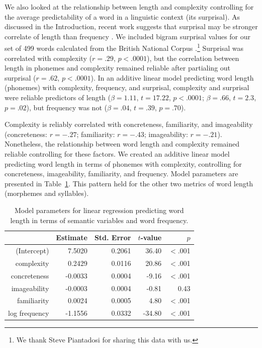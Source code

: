 \documentclass[man]{apa2}
\begin{document}
We also looked at the relationship between length and complexity controlling for the average predictability of a word in a linguistic context (its surprisal). As discussed in the Introduction, recent work suggests that surprisal may be stronger correlate of length than frequency \cite{piantadosi2011a}. We included bigram surprisal values for our set of 499 words calculated from the British National Corpus \cite{clear1993british}.\footnote{We thank Steve Piantadosi for sharing this data with us.} Surprisal was correlated with complexity ($r = .29$, $p < .0001$), but the correlation between length in phonemes and complexity remained reliable after partialing out surprisal ($r = .62$, $p < .0001$). In an additive linear model predicting word length (phonemes) with complexity, frequency, and surprisal, complexity and surprisal were reliable predictors of length ($\beta = 1.11$, $t = 17.22$, $p < .0001$; $\beta = .66$, $t = 2.3$, $p = .02$), but frequency was not ($\beta = .04$, $t = .39$, $p =. 70$).

Complexity is reliably correlated with concreteness, familiarity, and imageability (concreteness: $r = -.27$; familiarity: $r = -.43$; imageability: $r = -.21$). Nonetheless, the relationship between word length and complexity remained reliable controlling for these factors. We created an additive linear model predicting word length in terms of phonemes with complexity, controlling for concreteness, imageability, familiarity, and frequency. Model parameters are presented in Table~\ref{exp9model}. This pattern held for the other two metrics of word length (morphemes and syllables).

\begin{table}[t]
\centering
\begin{tabular}{rrrrr}
 \hline
 & Estimate & Std. Error & $t$-value & $p$ \\
 \hline
(Intercept) & 7.5020 & 0.2061 & 36.40 & $<$.001 \\
 complexity & 0.2429 & 0.0116 & 20.86 & $<$.001\\
  concreteness & -0.0033 & 0.0004 & -9.16 & $<$.001 \\
 imageability & -0.0003 & 0.0004 & -0.81 & 0.43 \\
  familiarity & 0.0024 & 0.0005 & 4.80 & $<$.001 \\
 log frequency & -1.1556 & 0.0332 & -34.80 & $<$.001 \\
  \hline
\end{tabular}
\caption{Model parameters for linear regression predicting word length in terms of semantic variables and word frequency.}
\label{exp9model}
\end{table}
\end{document}
